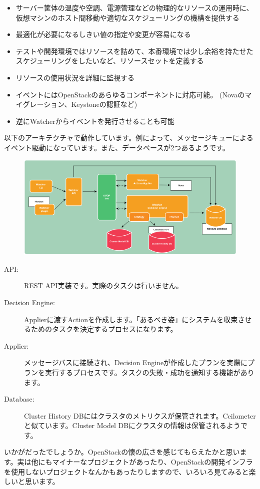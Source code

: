 \begin{itemize}
	\item サーバー筐体の温度や空調、電源管理などの物理的なリソースの運用時に、仮想マシンのホスト間移動や適切なスケジューリングの機構を提供する
	\item 最適化が必要になるしきい値の指定や変更が容易になる
	\item テストや開発環境ではリソースを詰めて、本番環境では少し余裕を持たせたスケジューリングをしたいなど、リソースセットを定義する
	\item リソースの使用状況を詳細に監視する
	\item イベントにはOpenStackのあらゆるコンポーネントに対応可能。 (Novaのマイグレーション、Keystoneの認証など)
	\item 逆にWatcherからイベントを発行させることも可能
\end{itemize}

以下のアーキテクチャで動作しています。例によって、メッセージキューによるイベント駆動になっています。また、データベースが2つあるようです。

\begin{figure}[htb]
	\begin{center}
		\includegraphics[width=\textwidth]{img/watcher-architecture.pdf}
	\end{center}
\end{figure}

\begin{description}
	\item[API:] REST API実装です。実際のタスクは行いません。
	\item[Decision Engine:] Applierに渡すActionを作成します。「あるべき姿」にシステムを収束させるためのタスクを決定するプロセスになります。
	\item[Applier:] メッセージバスに接続され、Decision Engineが作成したプランを実際にプランを実行するプロセスです。タスクの失敗・成功を通知する機能があります。
	\item[Database:] Cluster History DBにはクラスタのメトリクスが保管されます。Ceilometerと似ています。Cluster Model DBにクラスタの情報は保管されるようです。
\end{description}

いかがだったでしょうか。OpenStackの懐の広さを感じてもらえたかと思います。実は他にもマイナーなプロジェクトがあったり、OpenStackの開発インフラを使用しないプロジェクトなんかもあったりしますので、いろいろ見てみると楽しいと思います。

